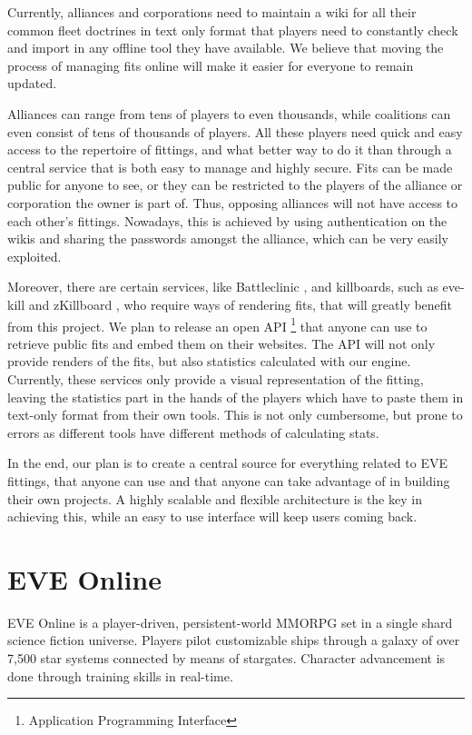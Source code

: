 Currently, alliances and corporations need to maintain a wiki for all their common fleet doctrines in text only format that players need to constantly check and import in any offline tool they have available. We believe that moving the process of managing fits online will make it easier for everyone to remain updated.

Alliances can range from tens of players to even thousands, while coalitions can even consist of tens of thousands of players. All these players need quick and easy access to the repertoire of fittings, and what better way to do it than through a central service that is both easy to manage and highly secure. Fits can be made public for anyone to see, or they can be restricted to the players of the alliance or corporation the owner is part of. Thus, opposing alliances will not have access to each other’s fittings. Nowadays, this is achieved by using authentication on the wikis and sharing the passwords amongst the alliance, which can be very easily exploited.

Moreover, there are certain services, like Battleclinic \cite{bc}, and killboards, such as eve-kill \cite{evekill} and zKillboard \cite{zkb}, who require ways of rendering fits, that will greatly benefit from this project. We plan to release an open API \footnote{Application Programming Interface} that anyone can use to retrieve public fits and embed them on their websites. The API will not only provide renders of the fits, but also statistics calculated with our engine. Currently, these services only provide a visual representation of the fitting, leaving the statistics part in the hands of the players which have to paste them in text-only format from their own tools. This is not only cumbersome, but prone to errors as different tools have different methods of calculating stats.

In the end, our plan is to create a central source for everything related to EVE fittings, that anyone can use and that anyone can take advantage of in building their own projects. A highly scalable and flexible architecture is the key in achieving this, while an easy to use interface will keep users coming back.

\section{EVE Online}
EVE Online is a player-driven, persistent-world MMORPG set in a single shard science fiction universe. Players pilot customizable ships through a galaxy of over 7,500 star systems connected by means of stargates. Character advancement is done through training skills \cite{skills} in real-time.

